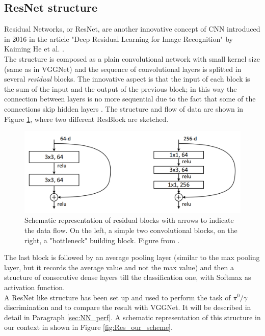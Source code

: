 \subsection*{ResNet structure} \label{subsec:ResNet_teo}
Residual Networks, or ResNet, are another innovative concept of CNN introduced in 2016 in the article "Deep Residual Learning for Image Recognition" by Kaiming He et al. \cite{ResNetArt}.\\
The structure is composed as a plain convolutional network with small kernel size (same as in VGGNet) and the sequence of convolutional  layers is splitted in several \textit{residual} blocks. The innovative aspect is that the input of each block is the sum of the input and the output of the previous block; in this way the connection between layers is no more sequential due to the fact that some of the connections skip hidden layers%
. The structure and flow of data are shown in Figure \ref{fig:ResNet_scheme}, where two different ResBlock are sketched.\\

\begin{figure}
	\centering
	\includegraphics[width=.7\textwidth]{IMG/Cap6/ResNet_scheme.png}
	\caption{Schematic representation of residual blocks with arrows to indicate the data flow. On the left, a simple two convolutional blocks, on the right, a "bottleneck" building block. Figure from \cite{ResNetArt}.}
	\label{fig:ResNet_scheme}
\end{figure}

The last block is followed by an average pooling layer (similar to the max pooling layer, but it records the average value and not the max value) and then a structure of consecutive dense layers till the classification one, with Softmax as activation function.\\

A ResNet like structure has been set up and used to perform the task of $\pi^0/\gamma$ discrimination and to compare the result with VGGNet. It will be described in detail in Paragraph \ref{sec:NN_perf}. A schematic representation of this structure in our context in shown in Figure \ref{fig:Res_our_scheme}.

